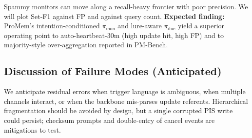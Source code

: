 Spammy monitors can move along a recall-heavy frontier with poor precision. We will plot Set-F1 against FP and against query count. \textbf{Expected finding:} ProMem's intention-conditioned $\pi_{\mathrm{mon}}$ and lure-aware $\pi_{\mathrm{due}}$ yield a superior operating point to auto-heartbeat-30m (high update hit, high FP) and to majority-style over-aggregation reported in PM-Bench.
\vspace{10pt}
\subsection{Discussion of Failure Modes (Anticipated)}

We anticipate residual errors when trigger language is ambiguous, when multiple channels interact, or when the backbone mis-parses update referents. Hierarchical fragmentation should be avoided by design, but a single corrupted PIS write could persist; checksum prompts and double-entry of cancel events are mitigations to test.
